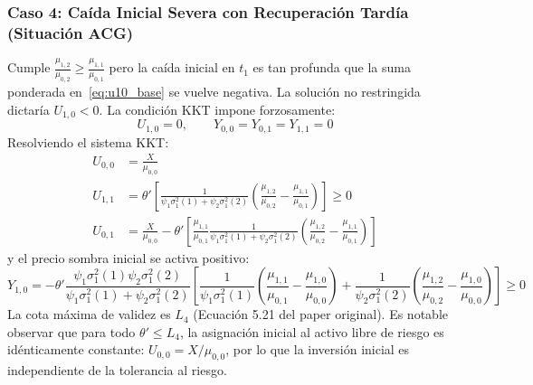 \documentclass[11pt,a4paper]{report}
\numberwithin{equation}{chapter}
\begin{document}
\subsubsection{Caso 4: Caída Inicial Severa con Recuperación Tardía (Situación ACG)}
Cumple $\frac{\mu_{1,2}}{\mu_{0,2}} \ge \frac{\mu_{1,1}}{\mu_{0,1}}$ pero la caída inicial en $t_1$ es tan profunda que la suma ponderada en~\eqref{eq:u10_base} se vuelve negativa. La solución no restringida dictaría $U_{1,0} < 0$. La condición KKT impone forzosamente:
\begin{equation}
    U_{1,0} = 0, \qquad Y_{0,0} = Y_{0,1} = Y_{1,1} = 0
\end{equation}
Resolviendo el sistema KKT:
\begin{align}
    U_{0,0} &= \frac{X}{\mu_{0,0}} \\
    U_{1,1} &= \theta' \left[ \frac{1}{\psi_1 \sigma_1^2(1) + \psi_2 \sigma_1^2(2)} \left( \frac{\mu_{1,2}}{\mu_{0,2}} - \frac{\mu_{1,1}}{\mu_{0,1}} \right) \right] \ge 0 \\
    U_{0,1} &= \frac{X}{\mu_{0,0}} - \theta' \left[ \frac{\mu_{1,1}}{\mu_{0,1}} \frac{1}{\psi_1 \sigma_1^2(1) + \psi_2 \sigma_1^2(2)} \left( \frac{\mu_{1,2}}{\mu_{0,2}} - \frac{\mu_{1,1}}{\mu_{0,1}} \right) \right]
\end{align}
y el precio sombra inicial se activa positivo:
\begin{equation}
    \boxed{Y_{1,0} = -\theta' \frac{\psi_1 \sigma_1^2(1) \psi_2 \sigma_1^2(2)}{\psi_1 \sigma_1^2(1) + \psi_2 \sigma_1^2(2)} \left[ \frac{1}{\psi_1 \sigma_1^2(1)} \left( \frac{\mu_{1,1}}{\mu_{0,1}} - \frac{\mu_{1,0}}{\mu_{0,0}} \right) + \frac{1}{\psi_2 \sigma_1^2(2)} \left( \frac{\mu_{1,2}}{\mu_{0,2}} - \frac{\mu_{1,0}}{\mu_{0,0}} \right) \right] \ge 0}
\end{equation}
La cota máxima de validez es $L_4$ (Ecuación 5.21 del paper original). Es notable observar que para todo $\theta' \le L_4$, la asignación inicial al activo libre de riesgo es idénticamente constante: $U_{0,0} = X/\mu_{0,0}$, por lo que la inversión inicial es independiente de la tolerancia al riesgo.
\end{document}
